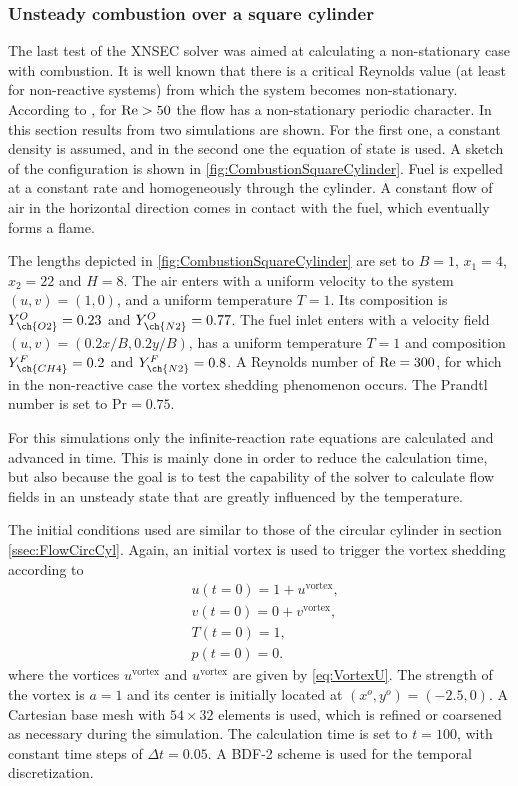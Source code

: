 \subsubsection{Unsteady combustion over a square cylinder}
The last test of the XNSEC solver was aimed at calculating a non-stationary case with combustion. It is well known that there is a critical Reynolds value (at least for non-reactive systems) from which the system becomes non-stationary. According to \textcite{sharmaHEATFLUIDFLOW2004}, for $\text{Re} > 50$ the flow has a non-stationary periodic character. In this section results from two simulations are shown. For the first one, a constant density is assumed, and in the second one the equation of state is used. 
A sketch of the configuration is shown in \cref{fig:CombustionSquareCylinder}. Fuel is expelled at a constant rate and homogeneously through the cylinder. A constant flow of air in the horizontal direction comes in contact with the fuel, which eventually forms a flame.

The lengths depicted in \cref{fig:CombustionSquareCylinder} are set to $B = 1$, $x_1 = 4$, $x_2 = 22$ and $H = 8$. The air enters with a uniform velocity to the system $(u,v) =(1,0)$, and a uniform temperature $T = 1$. Its composition is $Y^O_{\ch{O2}} = 0.23$ and $Y^O_{\ch{N2}} = 0.77$. The fuel inlet enters with a velocity field $(u,v) = (0.2x/B,0.2y/B)$, has a uniform temperature $T = 1$ and composition $Y^F_{\ch{CH4}} = 0.2$ and $Y^F_{\ch{N2}} = 0.8$. A Reynolds number of $\text{Re} = 300$, for which in the non-reactive case the vortex shedding phenomenon occurs. The Prandtl number is set to $\text{Pr} = 0.75$. 

For this simulations only the infinite-reaction rate equations are calculated and advanced in time. This is mainly done in order to reduce the calculation time, but also because the goal is to test the capability of the solver to calculate flow fields in an unsteady state that are greatly influenced by the temperature.  

The initial conditions used are similar to those of the circular cylinder in section \cref{ssec:FlowCircCyl}. Again, an initial vortex is used to trigger the vortex shedding according to
\begin{subequations} 
	\begin{align}
		&u(t=0) = 1 + u^{\text{vortex}},  \\
		&v(t=0) = 0 + v^{\text{vortex}},  \\
		&T(t=0) = 1,\\
		&p(t=0) = 0.
	\end{align}
\end{subequations}
where the vortices $u^{\text{vortex}}$ and $u^{\text{vortex}}$ are given by \cref{eq:VortexU}. The strength of the vortex is $a=1$ and its center is initially located at $(x^o,y^o) = (-2.5, 0)$. A Cartesian base mesh with $54\times32$ elements is used, which is refined or coarsened as necessary during the simulation. The calculation time is set to $t = 100$, with constant time steps of $\Delta t = 0.05$.  A BDF-2 scheme is used for the temporal discretization.

